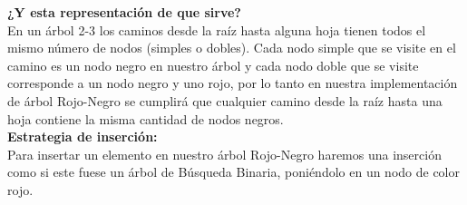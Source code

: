 \documentclass[dcc,sol]{fcfmcourse}
\begin{document}
\textbf{¿Y esta representación de que sirve?}\\
En un árbol 2-3 los caminos desde la raíz hasta alguna hoja tienen todos el mismo número de nodos (simples o dobles). Cada nodo simple que se visite en el camino es un nodo negro en nuestro árbol y cada nodo doble que se visite corresponde a un nodo negro y uno rojo, por lo tanto en nuestra implementación de árbol Rojo-Negro se cumplirá que cualquier camino desde la raíz hasta una hoja contiene la misma cantidad de nodos negros.\\

\textbf{Estrategia de inserción:}\\
Para insertar un elemento en nuestro árbol Rojo-Negro haremos una inserción como si este fuese un árbol de Búsqueda Binaria, poniéndolo en un nodo de color rojo. \\
\end{document}
